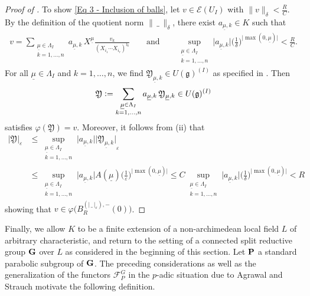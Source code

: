 \documentclass[a4paper, reqno, 10pt]{amsart}
\theoremstyle{definition}
\numberwithin{equation}{section}
\newcommand{\abs}[1]{{\lvert{#1}\rvert}}
\newcommand{\blank}{{\,\_\,}}
\newcommand{\defeq}{\vcentcolon=}
\newcommand{\ul}[1]{{\underline{#1}}}
\newcommand{\CE}{{\mathcal {E}}}
\newcommand{\CF}{{\mathcal {F}}}
\newcommand{\bG}{{\mathrm{\bf G}}}
\newcommand{\bP}{{\mathrm{\bf P}}}
\newcommand{\Fg}{{\mathfrak {g}}}
\newcommand{\FY}{{\mathfrak {Y}}}
\begin{document}
\begin{proof}[{Proof of }]
	To show \eqref{Eq 3 - Inclusion of balls}, let $v\in \CE(U_I)$ with $\lVert v \rVert_\delta < \frac{R}{C}$.
	By the definition of the quotient norm $\lVert\blank\rVert_\delta$, there exist $a_{\ul{\mu},k} \in K$ such that
	\begin{align*}
		v = \sum_{\substack{\ul{\mu} \in \Lambda_I \\ k=1,\ldots,n}} a_{\ul{\mu},k} \, X^\ul{\mu} \frac{v_k}{(X_{i_1}\cdots X_{i_r})^{l_k}}
		\qquad \text{and} \qquad
		\sup_{\substack{\ul{\mu} \in \Lambda_I \\ k=1,\ldots,n}} \abs{a_{\ul{\mu},k}} \bigg( \frac{1}{\delta} \bigg)^{\abs{\max(0,\ul{\mu})}} < \frac{R}{C} .
	\end{align*}
	For all $\ul{\mu} \in \Lambda_I$ and $k=1,\ldots,n$, we find $\FY_{\ul{\mu},k} \in U(\Fg)^{(I)}$ as specified in .
	Then
	\begin{equation*}
		\FY \defeq \sum_{\substack{\ul{\mu} \in \Lambda_I\\ k=1,\ldots,n }} a_{\ul{\mu},k} \, \FY_{\ul{\mu},k} \in U(\Fg)^{(I)} 
	\end{equation*}
	satisfies $\varphi(\FY) = v$.
	Moreover, it follows from  (ii) that
	\begin{align*}
		\lvert \FY \rvert_\varepsilon
			&\leq \sup_{\substack{\ul{\mu} \in \Lambda_I\\ k=1,\ldots,n }} \abs{a_{\ul{\mu},k}} \abs{\FY_{\ul{\mu},k}}_\varepsilon \\
			&\leq \sup_{\substack{\ul{\mu} \in \Lambda_I\\ k=1,\ldots,n }} \abs{a_{\ul{\mu},k}} A(\ul{\mu}) \bigg(\frac{1}{\varepsilon}\bigg)^{\abs{\max(0,\ul{\mu})}}
			\leq C \sup_{\substack{\ul{\mu} \in \Lambda_I\\ k=1,\ldots,n }} \abs{a_{\ul{\mu},k}} \bigg(\frac{1}{\delta}\bigg)^{\abs{\max(0,\ul{\mu})}}
			< R
	\end{align*}
	showing that $v \in \varphi\big( B_{R}^{(\abs{\blank}_\varepsilon), - } (0) \big)$.
\end{proof}









Finally, we allow $K$ to be a finite extension of a non-archimedean local field $L$ of arbitrary characteristic, and return to the setting of a connected split reductive group $\bG$ over $L$ as considered in the beginning of this section.
Let $\bP$ a standard parabolic subgroup of $\bG$.
The preceding considerations as well as the generalization of the functors $\CF^G_P$ in the $p$-adic situation due to Agrawal and Strauch \cite{AgrawalStrauch22FromCatOLocAnRep} motivate the following definition.
\end{document}

